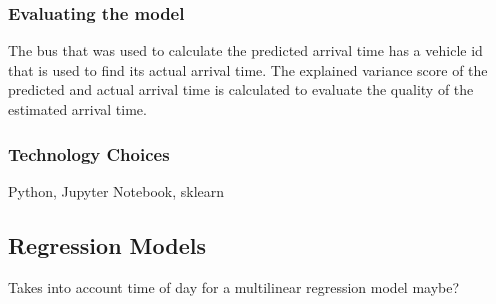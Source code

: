 \subsubsection{Evaluating the model}

The bus that was used to calculate the predicted arrival time has a vehicle id that is used to find its actual arrival time. The explained variance score of the predicted and actual arrival time is calculated to evaluate the quality of the estimated arrival time. 

\subsubsection{Technology Choices}

Python, Jupyter Notebook, sklearn

\subsection{Regression Models}

Takes into account time of day for a multilinear regression model maybe? 

\clearpage